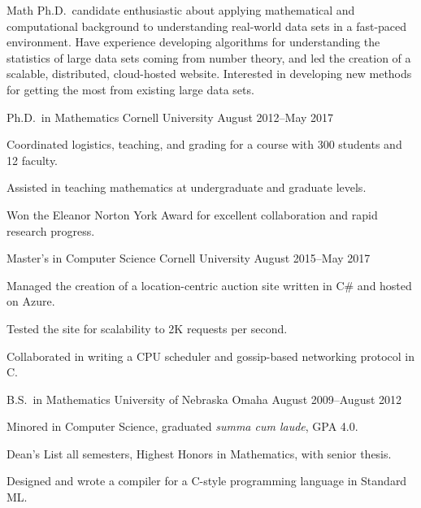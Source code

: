 \documentclass[11pt, letterpaper]{awesome-cv}
\begin{document}
\makecvheader






\begin{cvparagraph}
Math Ph.D.~candidate enthusiastic about applying mathematical and computational background to understanding real-world data sets in a fast-paced environment. 
Have experience developing algorithms for understanding the statistics of large data sets coming from number theory, and led the creation of a scalable, distributed, cloud-hosted website. 
Interested in developing new methods for getting the most from existing large data sets.
\end{cvparagraph}






\begin{cventries}

\cventry
	{Ph.D.~in Mathematics}
	{Cornell University}
	{}
	{August 2012--May 2017}
	{
		\begin{cvitems}
			\item{Coordinated logistics, teaching, and grading for a course with 300 students and 12 faculty.}
			\item{Assisted in teaching mathematics at undergraduate and graduate levels.}
			\item{Won the Eleanor Norton York Award for excellent collaboration and rapid research progress.}
		\end{cvitems}
	}
	
\cventry
	{Master's in Computer Science}
	{Cornell University}
	{}
	{August 2015--May 2017}
	{
		\begin{cvitems}
			\item{Managed the creation of a location-centric auction site written in C\# and hosted on Azure.}
			\item{Tested the site for scalability to 2K requests per second.}
			\item{Collaborated in writing a CPU scheduler and gossip-based networking protocol in C.}
		\end{cvitems}
	}
	
\cventry
	{B.S.~in Mathematics}
	{University of Nebraska Omaha}
	{}
	{August 2009--August 2012}
	{
		\begin{cvitems}
			\item{Minored in Computer Science, graduated \emph{summa cum laude}, GPA 4.0.}
			\item{Dean's List all semesters, Highest Honors in Mathematics, with senior thesis.}
			\item{Designed and wrote a compiler for a C-style programming language in Standard ML.}
		\end{cvitems}
	}
	
\end{cventries}
\end{document}
